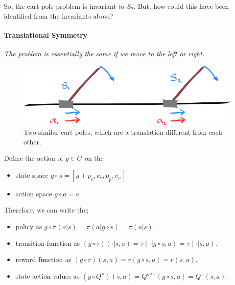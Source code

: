 So, the cart pole problem is invariant to $S_2$. But, how could this have been identified from the invariants above?


\paragraph{Translational Symmetry}

\begin{displayquote}
  \textit{The problem is essentially the same if we move to the left or right.}
\end{displayquote}

\begin{figure}[h!]
\centering
\includegraphics[width=1\textwidth,height=0.25\textheight]{../../pictures/drawings/cart-pole-translation.png}
\caption{Two similar cart poles, which are a translation different from each other.}
\end{figure}


Define the action of $g \in G$ on the

\begin{itemize}
	\tightlist
	\item state space $g \circ s = [g+p_c, v_c, p_p, v_p]$
	\item action space $g \circ a = a$
\end{itemize}

Therefore, we can write the;
\begin{itemize}
	\tightlist
 	\item policy as $g \circ \pi(a | s) = \pi(a | g \circ s) = \pi(a | s)$.
	\item transition function as $(g \circ \tau)(\cdot | s, a) = \tau(\cdot| g \circ s, a) = \tau(\cdot | s, a)$.
	\item reward function as $(g \circ r)(s, a) = r(g \circ s, a) = r(s, a)$.
  \item state-action values as $(g \circ Q^{\pi})(s, a) = Q^{g \circ \pi}(g \circ s, a) = Q^{\pi}(s, a)$.
\end{itemize}


